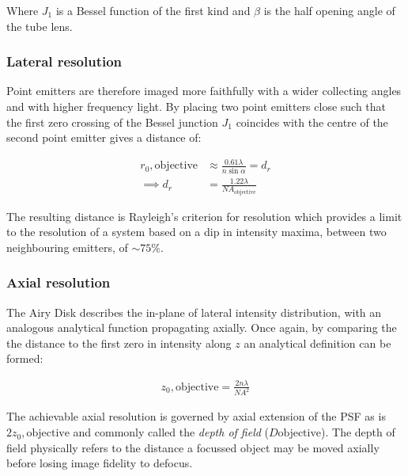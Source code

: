 Where $J_1$ is a Bessel function of the first kind and $\beta$ is the half opening angle of the tube lens.

\subsubsection{Lateral resolution}

Point emitters are therefore imaged more faithfully with a wider collecting angles and with higher frequency light.
By placing two point emitters close such that the first zero crossing of the Bessel junction $J_1$ coincides with the centre of the second point emitter gives a distance of:

\begin{align}
    r_0,\text{objective} &\approx \frac{0.61\lambda}{n\sin\alpha} = d_r \\
    \implies d_r &= \frac{1.22 \lambda}{NA_{\text{objective}}}
\end{align}

The resulting distance is Rayleigh's criterion for resolution which provides a limit to the resolution of a system based on a dip in intensity maxima, between two neighbouring emitters, of $\sim 75\%$.

\subsubsection{Axial resolution}

The Airy Disk describes the in-plane of lateral intensity distribution, with an analogous analytical function propagating axially.
Once again, by comparing the the distance to the first zero in intensity along $z$ an analytical definition can be formed:

\begin{align}
    z_0,\text{objective} = \frac{2n\lambda}{NA^2} \label{eq:}
\end{align}

The achievable axial resolution is governed by axial extension of the PSF as is $2z_0,\text{objective}$ and commonly called the \emph{depth of field} ($D\text{objective}$).
The depth of field physically refers to the distance a focussed object may be moved axially before losing image fidelity to defocus.

%
%


